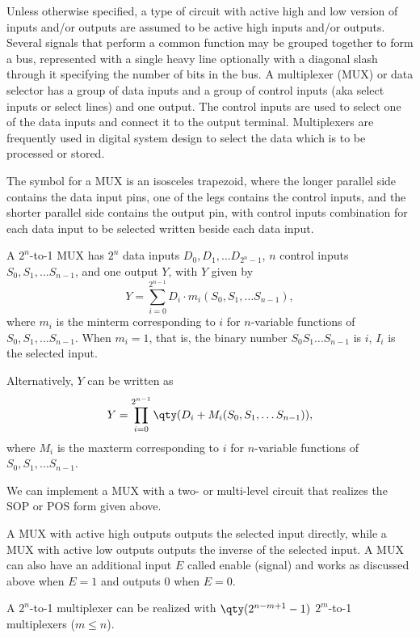 \documentclass[a4paper,12pt]{article}
\begin{document}
\begin{itemize}
\begin{itemize}
\begin{itemize}
\begin{itemize}
\begin{itemize}
\begin{itemize}
\begin{itemize}
Unless otherwise specified, a type of circuit with active high and low version of inputs and/or outputs are assumed to be active high inputs and/or outputs.
Several signals that perform a common function may be grouped together to form a bus, represented with a single heavy line optionally with a diagonal slash through it specifying the number of bits in the bus.
A multiplexer (MUX) or data selector has a group of data inputs and a group of control inputs (aka select inputs or select lines) and one output. The control inputs are used to select one of the data inputs and connect it to the output terminal. Multiplexers are frequently used in digital system design to select the data which is to be processed or stored.

The symbol for a MUX is an isosceles trapezoid, where the longer parallel side contains the data input pins, one of the legs contains the control inputs, and the shorter parallel side contains the output pin, with control inputs combination for each data input to be selected written beside each data input.

A $2^n$-to-1 MUX has $2^n$ data inputs $D_0,D_1,\ldots D_{2^n-1}$, $n$ control inputs $S_0,S_1,\ldots S_{n-1}$, and one output $Y$, with $Y$ given by
\[Y=\sum_{i=0}^{2^{n-1}}D_i\cdot m_i(S_0,S_1,\ldots S_{n-1}),\]
where $m_i$ is the minterm corresponding to $i$ for $n$-variable functions of $S_0,S_1,\ldots S_{n-1}$. When $m_i=1$, that is, the binary number $S_0S_1\ldots S_{n-1}$ is $i$, $I_i$ is the selected input.

Alternatively, $Y$ can be written as
\[Y=\prod_{i=0}^{2^{n-1}}\qty(D_i+M_i(S_0,S_1,\ldots S_{n-1})),\]
where $M_i$ is the maxterm corresponding to $i$ for $n$-variable functions of $S_0,S_1,\ldots S_{n-1}$.

We can implement a MUX with a two- or multi-level circuit that realizes the SOP or POS form given above.

A MUX with active high outputs outputs the selected input directly, while a MUX with active low outputs outputs the inverse of the selected input. A MUX can also have an additional input $E$ called enable (signal) and works as discussed above when $E=1$ and outputs $0$ when $E=0$.

A $2^n$-to-1 multiplexer can be realized with $\qty(2^{n-m+1}-1)$ $2^m$-to-1 multiplexers ($m\leq n$).


\end{itemize}
\end{itemize}
\end{itemize}
\end{itemize}
\end{itemize}
\end{itemize}
\end{itemize}
\end{document}
